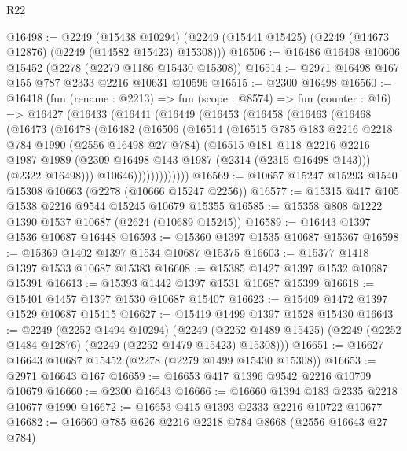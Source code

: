\begin{lexlean}{R22}
\begin{coremodule}
@16498 := @2249
    (@15438 @10294)
    (@2249 (@15441 @15425) (@2249 (@14673 @12876) (@2249 (@14582 @15423) @15308)))
@16506 := @16486 @16498 @10606 @15452 (@2278 (@2279 @1186 @15430 @15308))
@16514 := @2971 @16498 @167 @155 @787 @2333 @2216 @10631 @10596
@16515 := @2300 @16498
@16560 := @16418
    (fun (rename : @2213) =>
    fun (scope : @8574) =>
    fun (counter : @16) =>
    @16427
      (@16433
        (@16441
          (@16449
            (@16453
              (@16458
                (@16463
                  (@16468
                    (@16473
                      (@16478
                        (@16482
                          (@16506
                            (@16514
                              (@16515
                                @785
                                @183
                                @2216
                                @2218
                                @784
                                @1990
                                (@2556 @16498 @27 @784)
                                (@16515
                                  @181
                                  @118
                                  @2216
                                  @2216
                                  @1987
                                  @1989
                                  (@2309 @16498 @143 @1987 (@2314 (@2315 @16498 @143)))
                                  (@2322 @16498)))
                              @10646)))))))))))))
@16569 := @10657 @15247 @15293 @1540 @15308 @10663 (@2278 (@10666 @15247 @2256))
@16577 := @15315 @417 @105 @1538 @2216 @9544 @15245 @10679 @15355
@16585 := @15358 @808 @1222 @1390 @1537 @10687 (@2624 (@10689 @15245))
@16589 := @16443 @1397 @1536 @10687 @16448
@16593 := @15360 @1397 @1535 @10687 @15367
@16598 := @15369 @1402 @1397 @1534 @10687 @15375
@16603 := @15377 @1418 @1397 @1533 @10687 @15383
@16608 := @15385 @1427 @1397 @1532 @10687 @15391
@16613 := @15393 @1442 @1397 @1531 @10687 @15399
@16618 := @15401 @1457 @1397 @1530 @10687 @15407
@16623 := @15409 @1472 @1397 @1529 @10687 @15415
@16627 := @15419 @1499 @1397 @1528 @15430
@16643 := @2249
    (@2252 @1494 @10294)
    (@2249 (@2252 @1489 @15425) (@2249 (@2252 @1484 @12876) (@2249 (@2252 @1479 @15423) @15308)))
@16651 := @16627 @16643 @10687 @15452 (@2278 (@2279 @1499 @15430 @15308))
@16653 := @2971 @16643 @167
@16659 := @16653 @417 @1396 @9542 @2216 @10709 @10679
@16660 := @2300 @16643
@16666 := @16660 @1394 @183 @2335 @2218 @10677 @1990
@16672 := @16653 @415 @1393 @2333 @2216 @10722 @10677
@16682 := @16660 @785 @626 @2216 @2218 @784 @8668 (@2556 @16643 @27 @784)

\end{coremodule}
\end{lexlean}
